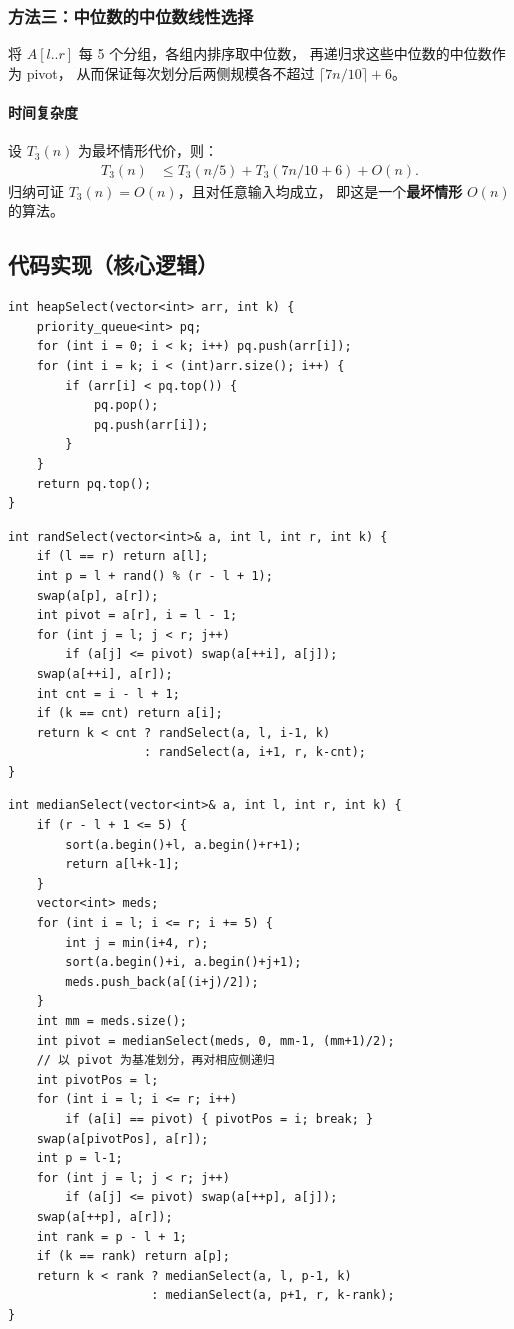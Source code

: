 \documentclass[12pt, a4paper]{ctexart}
\begin{document}
\subsubsection{方法三：中位数的中位数线性选择}

将 $A[l..r]$ 每 5 个分组，各组内排序取中位数，
再递归求这些中位数的中位数作为 pivot，
从而保证每次划分后两侧规模各不超过 $\lceil 7n/10 \rceil + 6$。

\paragraph{时间复杂度} 设 $T_3(n)$ 为最坏情形代价，则：
\begin{align*}
  T_3(n) &\le T_3(n/5) + T_3(7n/10 + 6) + O(n).
\end{align*}
归纳可证 $T_3(n) = O(n)$，且对任意输入均成立，
即这是一个\textbf{最坏情形} $O(n)$ 的算法。

\subsection{代码实现（核心逻辑）}

\begin{lstlisting}[caption={方法一：基于大根堆的选择}]
int heapSelect(vector<int> arr, int k) {
    priority_queue<int> pq;
    for (int i = 0; i < k; i++) pq.push(arr[i]);
    for (int i = k; i < (int)arr.size(); i++) {
        if (arr[i] < pq.top()) {
            pq.pop();
            pq.push(arr[i]);
        }
    }
    return pq.top();
}
\end{lstlisting}

\begin{lstlisting}[caption={方法二：随机划分选择（QuickSelect）}]
int randSelect(vector<int>& a, int l, int r, int k) {
    if (l == r) return a[l];
    int p = l + rand() % (r - l + 1);
    swap(a[p], a[r]);
    int pivot = a[r], i = l - 1;
    for (int j = l; j < r; j++)
        if (a[j] <= pivot) swap(a[++i], a[j]);
    swap(a[++i], a[r]);
    int cnt = i - l + 1;
    if (k == cnt) return a[i];
    return k < cnt ? randSelect(a, l, i-1, k)
                   : randSelect(a, i+1, r, k-cnt);
}
\end{lstlisting}

\begin{lstlisting}[caption={方法三：中位数的中位数线性选择（递归核心）}]
int medianSelect(vector<int>& a, int l, int r, int k) {
    if (r - l + 1 <= 5) {
        sort(a.begin()+l, a.begin()+r+1);
        return a[l+k-1];
    }
    vector<int> meds;
    for (int i = l; i <= r; i += 5) {
        int j = min(i+4, r);
        sort(a.begin()+i, a.begin()+j+1);
        meds.push_back(a[(i+j)/2]);
    }
    int mm = meds.size();
    int pivot = medianSelect(meds, 0, mm-1, (mm+1)/2);
    // 以 pivot 为基准划分，再对相应侧递归
    int pivotPos = l;
    for (int i = l; i <= r; i++)
        if (a[i] == pivot) { pivotPos = i; break; }
    swap(a[pivotPos], a[r]);
    int p = l-1;
    for (int j = l; j < r; j++)
        if (a[j] <= pivot) swap(a[++p], a[j]);
    swap(a[++p], a[r]);
    int rank = p - l + 1;
    if (k == rank) return a[p];
    return k < rank ? medianSelect(a, l, p-1, k)
                    : medianSelect(a, p+1, r, k-rank);
}
\end{lstlisting}
\end{document}
